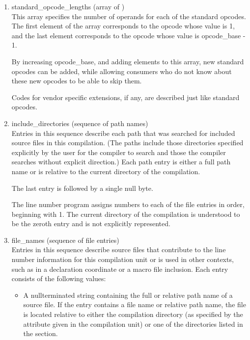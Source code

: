 \begin{enumerate}[1. ]
\item standard\_opcode\_lengths (array of ) \\
This array specifies the number of  operands for each
of the standard opcodes. The first element of the array
corresponds to the opcode whose value is 1, and the last
element corresponds to the opcode whose value 
is opcode\_base - 1.

By increasing opcode\_base, and adding elements to this array,
new standard opcodes can be added, while allowing consumers who
do not know about these new opcodes to be able to skip them.

Codes for vendor specific extensions, if any, are described
just like standard opcodes.

\item include\_directories (sequence of path names) \\
Entries 
in this sequence describe each path that was searched
for included source files in this compilation. (The paths
include those directories specified explicitly by the user for
the compiler to search and those the compiler searches without
explicit direction.) Each path entry is either a full path name
or is relative to the current directory of the compilation.

The last entry is followed by a single null byte.

The line number program assigns numbers to each of the file
entries in order, beginning with 1. The current directory of
the compilation is understood to be the zeroth entry and is
not explicitly represented.

\item  file\_names (sequence of file entries) \\
Entries 
in 
this sequence describe source files that contribute
to the line number information for this compilation unit or is
used in other contexts, such as in a declaration coordinate or
a macro file inclusion. Each entry consists of the following
values:


\begin{itemize}
\item A null\dash terminated string containing the full or relative
path name of a source file. If the entry contains a file
name or relative path name, the file is located relative
to either the compilation directory (as specified by the
attribute given in the compilation unit) or one
of the directories listed in the 
 section.


\end{itemize}
\end{enumerate}
